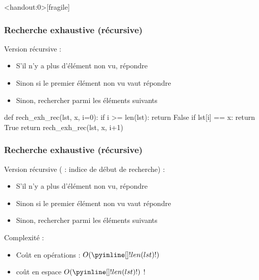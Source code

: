 \documentclass[12pt]{linfo-beamer}
\begin{document}
\begin{frame}<handout:0>[fragile]
  \frametitle{Recherche exhaustive (récursive)}

  Version récursive :
  \begin{itemize}
  \item S'il n'y a plus d'élément non vu, répondre 
  \item Sinon si le premier élément non vu vaut  répondre 
  \item Sinon, rechercher  parmi les éléments suivants
  \end{itemize}

  \pause
  \vfill

\begin{pyframe}{}
def rech_exh_rec(lst, x, i=0):
    if i >= len(lst):
        return False
    if lst[i] == x:
        return True
    return rech_exh_rec(lst, x, i+1)
\end{pyframe}

\end{frame}


\begin{frame}[fragile]
  \frametitle{Recherche exhaustive (récursive)}

  Version récursive ( : indice de début de recherche) :
  \begin{itemize}
  \item S'il n'y a plus d'élément non vu, répondre 
  \item Sinon si le premier élément non vu vaut  répondre 
  \item Sinon, rechercher  parmi les éléments suivants
  \end{itemize}

  \vfill

  Complexité :
  \begin{itemize}
  \item Coût en opérations : $O(\code{len(lst)})$
  \item {} coût en espace $O(\code{len(lst)})$ !
  \end{itemize}

\end{frame}

\end{document}

